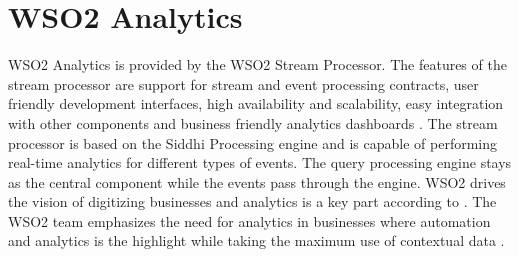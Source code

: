 \section{WSO2 Analytics}

WSO2 Analytics is provided by the WSO2 Stream Processor. The features of the stream processor are support for stream and event processing contracts, user friendly development interfaces, high availability and scalability, easy integration with other components and business friendly analytics dashboards \cite{hid-sp18-416-www-wso2-stream-processor}. The stream processor is based on the Siddhi Processing engine \cite{hid-sp18-416-github-siddhi} and is capable of  performing real-time analytics for different types of events. The query processing engine stays as the central component while the events pass through the engine. WSO2 drives the vision of digitizing businesses and analytics is a key part according to \cite{hid-sp18-416-www-srinath-conference-talk}. The WSO2 team emphasizes the need for analytics in businesses where automation and analytics is the highlight while taking the maximum use of contextual data \cite{hid-sp18-416-www-business-benefits-analytics}. 